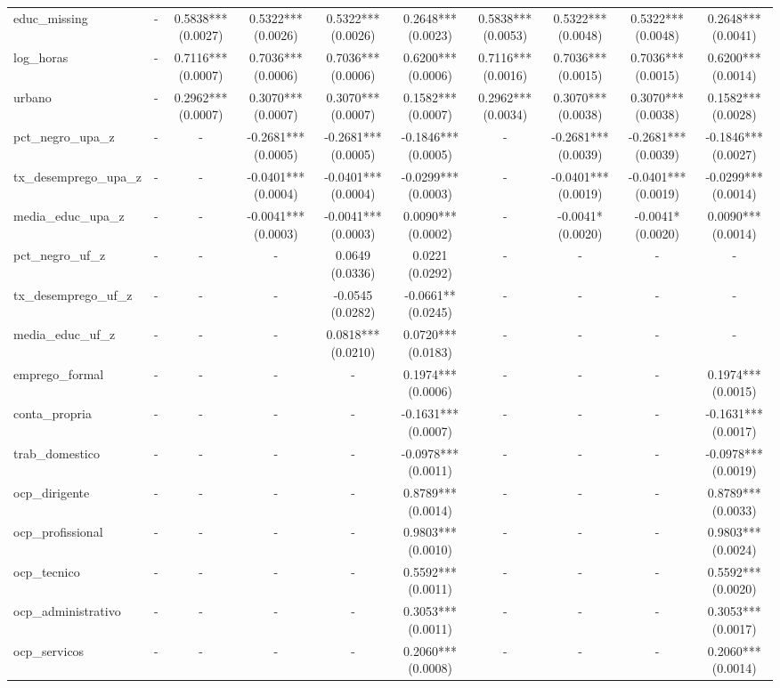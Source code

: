 \begin{table}
\begin{tabular}{lccccccccc}
educ_missing & - & 0.5838*** (0.0027) & 0.5322*** (0.0026) & 0.5322*** (0.0026) & 0.2648*** (0.0023) & 0.5838*** (0.0053) & 0.5322*** (0.0048) & 0.5322*** (0.0048) & 0.2648*** (0.0041) \\
log_horas & - & 0.7116*** (0.0007) & 0.7036*** (0.0006) & 0.7036*** (0.0006) & 0.6200*** (0.0006) & 0.7116*** (0.0016) & 0.7036*** (0.0015) & 0.7036*** (0.0015) & 0.6200*** (0.0014) \\
urbano & - & 0.2962*** (0.0007) & 0.3070*** (0.0007) & 0.3070*** (0.0007) & 0.1582*** (0.0007) & 0.2962*** (0.0034) & 0.3070*** (0.0038) & 0.3070*** (0.0038) & 0.1582*** (0.0028) \\
pct_negro_upa_z & - & - & -0.2681*** (0.0005) & -0.2681*** (0.0005) & -0.1846*** (0.0005) & - & -0.2681*** (0.0039) & -0.2681*** (0.0039) & -0.1846*** (0.0027) \\
tx_desemprego_upa_z & - & - & -0.0401*** (0.0004) & -0.0401*** (0.0004) & -0.0299*** (0.0003) & - & -0.0401*** (0.0019) & -0.0401*** (0.0019) & -0.0299*** (0.0014) \\
media_educ_upa_z & - & - & -0.0041*** (0.0003) & -0.0041*** (0.0003) & 0.0090*** (0.0002) & - & -0.0041* (0.0020) & -0.0041* (0.0020) & 0.0090*** (0.0014) \\
pct_negro_uf_z & - & - & - & 0.0649 (0.0336) & 0.0221 (0.0292) & - & - & - & - \\
tx_desemprego_uf_z & - & - & - & -0.0545 (0.0282) & -0.0661** (0.0245) & - & - & - & - \\
media_educ_uf_z & - & - & - & 0.0818*** (0.0210) & 0.0720*** (0.0183) & - & - & - & - \\
emprego_formal & - & - & - & - & 0.1974*** (0.0006) & - & - & - & 0.1974*** (0.0015) \\
conta_propria & - & - & - & - & -0.1631*** (0.0007) & - & - & - & -0.1631*** (0.0017) \\
trab_domestico & - & - & - & - & -0.0978*** (0.0011) & - & - & - & -0.0978*** (0.0019) \\
ocp_dirigente & - & - & - & - & 0.8789*** (0.0014) & - & - & - & 0.8789*** (0.0033) \\
ocp_profissional & - & - & - & - & 0.9803*** (0.0010) & - & - & - & 0.9803*** (0.0024) \\
ocp_tecnico & - & - & - & - & 0.5592*** (0.0011) & - & - & - & 0.5592*** (0.0020) \\
ocp_administrativo & - & - & - & - & 0.3053*** (0.0011) & - & - & - & 0.3053*** (0.0017) \\
ocp_servicos & - & - & - & - & 0.2060*** (0.0008) & - & - & - & 0.2060*** (0.0014) \\

\end{tabular}
\end{table}
